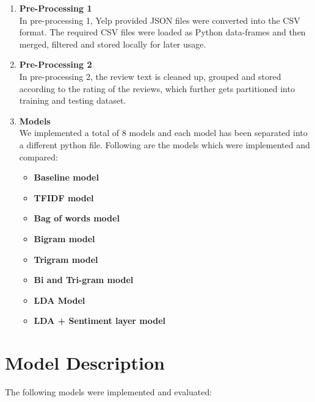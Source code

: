 \documentclass[paper=a4, fontsize=11pt]{scrartcl} %
\numberwithin{equation}{section} %
\numberwithin{figure}{section} %
\numberwithin{table}{section} %
\begin{document}
\begin{enumerate}
\item \textbf{Pre-Processing 1}\\
In pre-processing 1, Yelp provided JSON files were converted into the CSV format. The required CSV files were loaded as Python data-frames and then merged, filtered and stored locally for later usage.

\item \textbf{Pre-Processing 2}\\
In pre-processing 2, the review text is cleaned up, grouped and stored according to the rating of the reviews, which further gets partitioned into training and testing dataset.

\item	\textbf{Models}\\
We implemented a total of 8 models and each model has been separated into a different python file. Following are the models which were implemented and compared:
\begin{itemize}
\item \textbf{Baseline model}
\item \textbf{TFIDF model}
\item \textbf{Bag of words model}
\item \textbf{Bigram model}
\item \textbf{Trigram model}
\item \textbf{Bi and Tri-gram model}
\item \textbf{LDA Model}
\item \textbf{LDA + Sentiment layer model}
\end{itemize}
\end{enumerate}

\section{Model Description}
The following models were implemented and evaluated:
\end{document}
